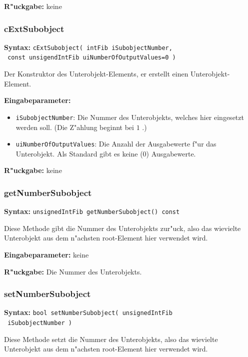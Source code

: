 \bigskip\noindent
\textbf{R"uckgabe:} keine


\subsubsection{cExtSubobject}

\textbf{Syntax:} \verb|cExtSubobject( intFib iSubobjectNumber,| \\\verb| const unsigendIntFib uiNumberOfOutputValues=0 )|

\bigskip\noindent
Der Konstruktor des Unterobjekt-Elements, er erstellt einen Unterobjekt-Element.

\bigskip\noindent
\textbf{Eingabeparameter:}
\begin{itemize}
 \item \verb|iSubobjectNumber|: Die Nummer des Unterobjekts, welches hier eingesetzt werden soll. (Die Z"ahlung beginnt bei $1$ .)
 \item \verb|uiNumberOfOutputValues|: Die Anzahl der Ausgabewerte f"ur das Unterobjekt. Als Standard gibt es keine ($0$) Ausgabewerte.
\end{itemize}

\bigskip\noindent
\textbf{R"uckgabe:} keine


\subsubsection{getNumberSubobject}

\textbf{Syntax:} \verb|unsignedIntFib getNumberSubobject() const|

\bigskip\noindent
Diese Methode gibt die Nummer des Unterobjekts zur"uck, also das wievielte Unterobjekt aus dem n"achsten root-Element hier verwendet wird.

\bigskip\noindent
\textbf{Eingabeparameter:} keine

\bigskip\noindent
\textbf{R"uckgabe:} Die Nummer des Unterobjekts.


\subsubsection{setNumberSubobject}

\textbf{Syntax:} \verb|bool setNumberSubobject( unsignedIntFib| \\\verb| iSubobjectNumber )|

\bigskip\noindent
Diese Methode setzt die Nummer des Unterobjekts, also das wievielte Unterobjekt aus dem n"achsten root-Element hier verwendet wird.

